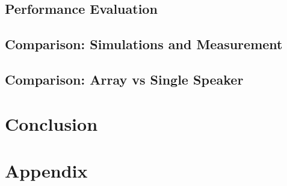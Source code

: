 	\chapter{Performance Evaluation}
	\chapter{Comparison: Simulations and Measurement}
	\chapter{Comparison: Array vs Single Speaker}


 
\part{Conclusion}\label{pt:conclusion}
% 
%

\glsresetall
\appendix %

 \graphicspath{{figures/appendix/}}
\part{Appendix}\label{pt:appendix}


